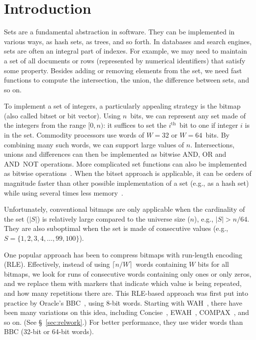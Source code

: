 \documentclass[times]{speauth}
\begin{document}

\maketitle


\section{Introduction}



Sets are a fundamental abstraction in
software. They can be implemented in various
ways, as hash sets, as trees, and so forth.
In databases and search engines, sets are often an integral
part of indexes. For example, we may need to maintain a set
of all documents or rows  (represented by numerical identifiers)
that satisfy some property. Besides adding or removing
elements from the set, we need fast functions
to compute the intersection, the union, the difference between sets, and so on.


To implement a set
of integers, a particularly appealing strategy is the
bitmap (also called bitset or bit vector). Using $n$~bits,
we can represent any set made of the integers from the range
$[0,n)$: it suffices to set the $i^{\mathrm{th}}$~bit to one if integer $i$ is in the set. Commodity processors
use words of $W=32$ or $W=64$~bits. By combining many such words, we can
support large values of $n$. Intersections, unions and differences can then be implemented as bitwise AND, OR and AND~NOT operations.
More complicated set functions can also be implemented as bitwise operations~\cite{SPE:SPE2289}.
When the bitset approach is applicable, it can be orders of
magnitude faster than other possible implementation of a set (e.g., as a hash set) while using several times less memory~\cite{colantonio:2010:ccn:1824821.1824857}.

Unfortunately, conventional bitmaps are only applicable when
the cardinality of the set ($|S|$) is relatively large compared to the
universe size ($n$), e.g., $|S| > n /64$.
They are also suboptimal when the set is made of
consecutive values (e.g., $S= \{1,2,3,4,\ldots,99,100\}$).

One popular approach has been to compress bitmaps
with run-length encoding (RLE). Effectively,
instead of using $\lceil n/W\rceil$~words containing $W$ bits
for all bitmaps, we look for runs of consecutive  words containing only
ones or only zeros, and we replace them
with markers that indicate which value is being repeated,
and how many repetitions there are. This RLE-based approach
was first put into practice by Oracle's BBC~\cite{874730},
using 8-bit words. Starting with WAH~\cite{wu2008breaking},
there have been many variations on this idea, including
Concise~\cite{colantonio:2010:ccn:1824821.1824857},
EWAH~\cite{arxiv:0901.3751}, COMPAX~\cite{netfli}, and so on. (See \S~\ref{sec:relwork}.) For better performance, 
they use wider words than BBC (32-bit or 64-bit words).
\end{document}

